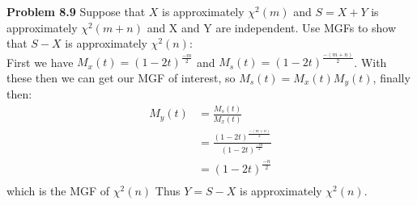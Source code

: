 
{\bf Problem 8.9}
Suppose that $X$ is approximately $\chi^{2}(m)$ and $S = X+Y$ is approximately $ \chi^{2}(m + n)$
and X and Y are independent. Use MGFs to show that $S-X$ is approximately $\chi^{2}(n)$:\\

First we have $M_{x}(t) = (1-2t)^{\frac{-m}{2}}$ and $M_{s}(t) = (1-2t)^{\frac{-(m+n)}{2}}$.
With these then we can get our MGF of interest, so $M_{s}(t) = M_{x}(t)M_{y}(t)$, finally then: \\
\begin{align*}
	M_{y}(t) & = \frac{M_{s}(t)}{M_{x}(t)} \\ 
	& = \frac{(1-2t)^{\frac{-(m+n)}{2}}}{(1-2t)^{\frac{-m}{2}}} \\
	& = (1-2t)^{\frac{-n}{2}} \\
\end{align*}
which is the MGF of $\chi^{2}(n)$ 
Thus $ Y=S-X $ is approximately $\chi^{2}(n)$.\\

